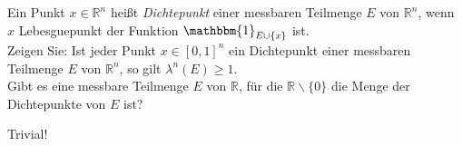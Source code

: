 \begin{exercise}

Ein Punkt $x \in \mathbb{R}^n$ heißt \textit{Dichtepunkt} einer messbaren Teilmenge $E$ von $\mathbb{R}^n$, wenn $x$ Lebesguepunkt der Funktion $\mathbbm{1}_{E\cup\{x\}}$ ist. \\

Zeigen Sie: Ist jeder Punkt $x \in [0,1]^n$ ein Dichtepunkt einer messbaren Teilmenge $E$ von $\mathbb{R}^n$, so gilt $\lambda^n(E) \geq 1$. \\

Gibt es eine messbare Teilmenge $E$ von $\mathbb{R}$, für die $\mathbb{R}\backslash\{0\}$ die Menge der Dichtepunkte von $E$ ist?

\end{exercise}

\begin{solution}

  Trivial!












\end{solution}
